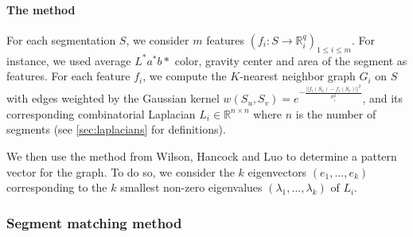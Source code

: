 \paragraph{The method} For each segmentation $S$, we consider $m$ features $(f_i : S \rightarrow \mathbb{R}_i^q)_{1 \leq i \leq m}$. For instance, we used average $L^*a^*b*$ color, gravity center and area of the segment as features. For each feature $f_i$, we compute the $K$-nearest neighbor graph $G_i$ on $S$ with edges weighted by the Gaussian kernel $w(S_u,S_v) = e^{-\frac{||f_i(S_u) - f_i(S_v)||^2}{\sigma_i^2}}$, and its corresponding combinatorial Laplacian  $L_i \in \mathbb{R}^{n \times n}$ where $n$ is the number of segments (see \autoref{sec:laplacians} for definitions). 


We then use the method from Wilson, Hancock and Luo \cite{wilson2005pattern} to determine a pattern vector for the graph. To do so, we consider the $k$ eigenvectors $(e_1, ..., e_k)$ corresponding to the $k$ smallest non-zero eigenvalues $(\lambda_1, ..., \lambda_k)$ of $L_i$. 



\subsubsection{Segment matching method}
\label{sec:segmentMatching}